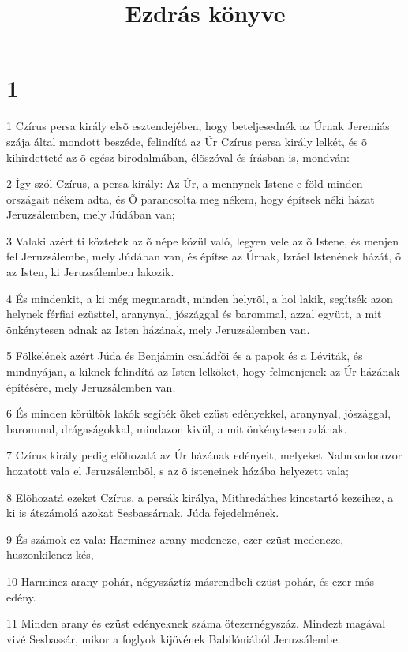 

\title{Ezdrás könyve}


\chapter{1}

\par 1 Czírus persa király elsõ esztendejében, hogy beteljesednék az Úrnak Jeremiás szája által mondott beszéde, felindítá az Úr Czírus persa király lelkét, és õ kihirdetteté az õ egész birodalmában, élõszóval és írásban is, mondván:
\par 2 Így szól Czírus, a persa király: Az Úr, a mennynek Istene e föld minden országait nékem adta, és Õ parancsolta meg nékem, hogy építsek néki házat Jeruzsálemben, mely Júdában van;
\par 3 Valaki azért ti köztetek az õ népe közül való, legyen vele az õ Istene, és menjen fel Jeruzsálembe, mely Júdában van, és építse az Úrnak, Izráel Istenének házát, õ az Isten, ki Jeruzsálemben lakozik.
\par 4 És mindenkit, a ki még megmaradt, minden helyrõl, a hol lakik, segítsék azon helynek férfiai ezüsttel, aranynyal, jószággal és barommal, azzal együtt, a mit önkénytesen adnak az Isten házának, mely Jeruzsálemben van.
\par 5 Fölkelének azért Júda és Benjámin családfõi és a papok és a Léviták, és mindnyájan, a kiknek felindítá az Isten lelköket, hogy felmenjenek az Úr házának építésére, mely Jeruzsálemben van.
\par 6 És minden körültök lakók segíték õket ezüst edényekkel, aranynyal, jószággal, barommal, drágaságokkal, mindazon kivül, a mit önkénytesen adának.
\par 7 Czírus király pedig elõhozatá az Úr házának edényeit, melyeket Nabukodonozor hozatott vala el Jeruzsálembõl, s az õ isteneinek házába helyezett vala;
\par 8 Elõhozatá ezeket Czírus, a persák királya, Mithredáthes kincstartó kezeihez, a ki is átszámolá azokat Sesbassárnak, Júda fejedelmének.
\par 9 És számok ez vala: Harmincz arany medencze, ezer ezüst medencze, huszonkilencz kés,
\par 10 Harmincz arany pohár, négyszáztíz másrendbeli ezüst pohár, és ezer más edény.
\par 11 Minden arany és ezüst edényeknek száma ötezernégyszáz. Mindezt magával vivé Sesbassár, mikor a foglyok kijövének Babilóniából Jeruzsálembe.

